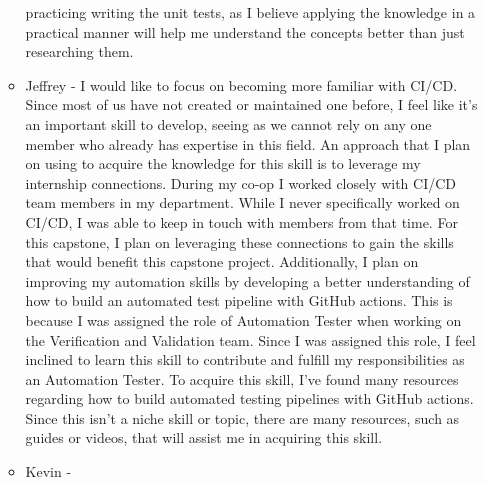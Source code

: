\documentclass[12pt, titlepage]{article}
\begin{document}
\begin{enumerate}
\begin{itemize}
    practicing writing the unit tests, as I believe applying the knowledge in a
    practical manner will help me understand the concepts better than just
    researching them.
    \item Jeffrey - I would like to focus on becoming more
    familiar with CI/CD. Since most of us have not created or
    maintained one before, I feel like it's an important
    skill to develop, seeing as we cannot rely on any
    one member who already has expertise in this field. An approach
    that I plan on using to acquire the knowledge for this
    skill is to leverage my internship connections. During my co-op
    I worked closely with CI/CD team members in my department.
    While I never specifically worked on CI/CD, I was able to keep
    in touch with members from that time. For this capstone, I plan
    on leveraging these connections to gain the skills
    that would benefit this capstone project. Additionally, I plan
    on improving my automation skills by developing a better
    understanding of how to build an automated test pipeline with
    GitHub actions. This is because I was assigned the role of
    Automation Tester when working on the Verification and
    Validation team. Since I was assigned this role,
    I feel inclined to learn this skill to contribute and fulfill
    my responsibilities as an Automation Tester. To acquire this
    skill, I've found many resources regarding how to build
    automated testing pipelines with GitHub actions. Since this
    isn't a niche skill or topic, there are many resources, such as
    guides or videos, that will assist me in acquiring this skill.
    \item Kevin -
  \end{itemize}
\end{enumerate}
\end{document}
